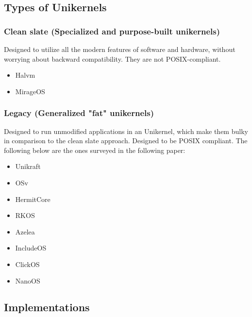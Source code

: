 \subsection{Types of Unikernels}
\subsubsection{Clean slate (Specialized and purpose-built unikernels)}
Designed to utilize all the modern features of software and hardware, without worrying about backward
compatibility. They are not POSIX-compliant. 
\begin{itemize}
  \item Halvm 
  \item MirageOS
\end{itemize}

\subsubsection{Legacy (Generalized "fat" unikernels)}
Designed to run unmodified applications in an Unikernel, 
which make them bulky in comparison to the clean slate approach. 
Designed to be POSIX compliant. The following below 
are the ones surveyed in the following paper: 
\begin{itemize}
  \item Unikraft
  \item OSv 
  \item HermitCore 
  \item RKOS
  \item Azelea
  \item IncludeOS 
  \item ClickOS
  \item NanoOS
\end{itemize}
%
%
\subsection{Implementations}

